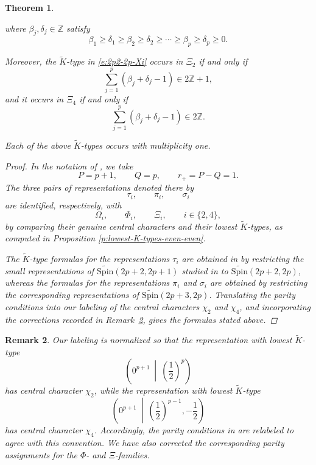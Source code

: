 \documentclass{amsart}
\newcommand{\bbZ}{{\mathbb Z}}
\newcommand{\Spin}{{\mathrm{Spin}}}
\newtheorem{thm}{Theorem}[section]
\newtheorem{remark}[thm]{Remark}
\theoremstyle{definition}
\newcommand{\tu}{\widetilde}
\begin{document}
\begin{thm}
\begin{enumerate}
where \(\beta_j,\delta_j\in\bbZ\) satisfy
\[
\beta_1
\geq\delta_1
\geq\beta_2
\geq\delta_2
\geq\cdots
\geq\beta_p
\geq\delta_p
\geq0.
\]

Moreover, the \(\tu K\)-type in \eqref{e:2p2-2p-Xi} occurs in
\(\Xi_2\) if and only if
\[
\sum_{j=1}^p
\left(\beta_j+\delta_j-1\right)
\in 2\bbZ+1,
\]
and it occurs in \(\Xi_4\) if and only if
\[
\sum_{j=1}^p
\left(\beta_j+\delta_j-1\right)
\in 2\bbZ.
\]

\end{enumerate}

Each of the above \(\tu K\)-types occurs with multiplicity one.
\begin{proof}




In the notation of \cite[Theorem~4.1, Case~2]{BTs18}, we take
\[
P=p+1,\qquad Q=p,\qquad r_+=P-Q=1.
\]
The three pairs of representations denoted there by
\[
\tau_i,\qquad \pi_i,\qquad \sigma_i
\]
are identified, respectively, with
\[
\Omega_i,\qquad \Phi_i,\qquad \Xi_i,
\qquad i\in\{2,4\},
\]
by comparing their genuine central characters and their lowest
\(\tu K\)-types, as computed in Proposition
\ref{p:lowest-K-types-even-even}.



    The \(\tu K\)-type formulas for the representations \(\tau_i\) are obtained in
\cite{BTs18} by restricting the small representations of
\(\tu{\Spin}(2p+2,2p+1)\) studied in \cite{LS08} to
\(\tu{\Spin}(2p+2,2p)\), whereas the formulas for the representations
\(\pi_i\) and \(\sigma_i\) are obtained by restricting the corresponding
representations of \(\tu{\Spin}(2p+3,2p)\).
Translating the parity conditions into our labeling of the central characters
\(\chi_2\) and \(\chi_4\), and incorporating the corrections recorded in
Remark~\ref{r:BTs18-corrections}, gives the formulas stated above.
\end{proof}

\end{thm}
\begin{remark}\label{r:BTs18-corrections}
Our labeling is normalized so that the representation with lowest
\(\tu K\)-type
\[
\left(
0^{p+1}
\ \middle|\
\left(\frac12\right)^p
\right)
\]
has central character \(\chi_2\), while the representation with lowest
\(\tu K\)-type
\[
\left(
0^{p+1}
\ \middle|\
\left(\frac12\right)^{p-1},-\frac12
\right)
\]
has central character \(\chi_4\). Accordingly, the parity conditions in
\cite[Theorem~4.1, Case~2]{BTs18} are relabeled to agree with this convention.
We have also corrected the corresponding parity assignments for the
\(\Phi\)- and \(\Xi\)-families.
\end{remark}
\end{document}
